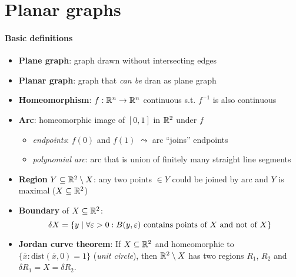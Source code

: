 \section{Planar graphs}

\paragraph{Basic definitions}
\begin{itemize}
  \item \textbf{Plane graph}: graph drawn without intersecting edges
  \item \textbf{Planar graph}: graph that \emph{can be} dran as plane graph
  \item \textbf{Homeomorphism}: $ f: \R^n \to \R^n $ continuous s.t. $ f^{-1} $ is also continuous 
  \item \textbf{Arc}: homeomorphic image of $ [0,1] $ in $ \R^2 $ under $ f $
  \begin{itemize}
    \item \emph{endpoints}: $ f(0) $ and $ f(1) $ $ \leadsto $ arc ``joins'' endpoints
    \item \emph{polynomial arc}: arc that is union of finitely many straight line segments
  \end{itemize}
  \item \textbf{Region} $ Y \subseteq \R^2 \setminus X $: any two points $ \in Y $ could be joined by arc and $ Y $ is maximal ($ X \subseteq \R^2 $)
  \item \textbf{Boundary} of $ X \subseteq \R^2 $:
    \begin{equation*}
      \delta X = \{ y \mid \forall \epsilon > 0 : B(y, \epsilon) \text{ contains points of $ X $ and not of $ X $} \}
    \end{equation*}
  \item \textbf{Jordan curve theorem}: If $ X \subseteq \R^2 $ and homeomorphic to $ \{ \overline{x} : \text{dist}(\overline{x}, 0) = 1 \} $ (\emph{unit circle}), then $ \R^2 \setminus X $ has two regions $ R_1 $, $ R_2 $ and $ \delta R_1 = X = \delta R_2 $.
\end{itemize}

